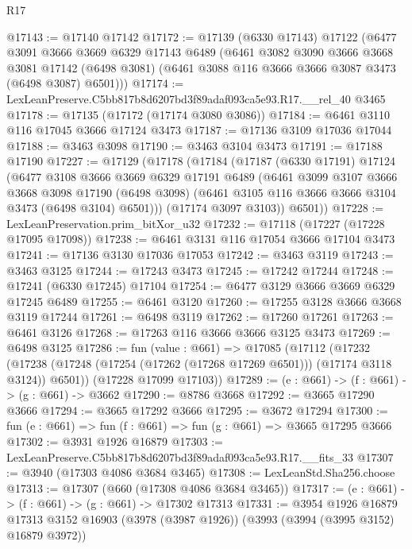 \begin{lexlean}{R17}
\begin{coremodule}
@17143 := @17140 @17142
@17172 := @17139
    (@6330 @17143)
    @17122
    (@6477
      @3091
      @3666
      @3669
      @6329
      @17143
      @6489
      (@6461
        @3082
        @3090
        @3666
        @3668
        @3081
        @17142
        (@6498 @3081)
        (@6461 @3088 @116 @3666 @3666 @3087 @3473 (@6498 @3087) @6501)))
@17174 := LexLeanPreserve.C5bb817b8d6207bd3f89adaf093ca5e93.R17.__rel_40 @3465
@17178 := @17135 (@17172 (@17174 @3080 @3086))
@17184 := @6461 @3110 @116 @17045 @3666 @17124 @3473
@17187 := @17136 @3109 @17036 @17044
@17188 := @3463 @3098
@17190 := @3463 @3104 @3473
@17191 := @17188 @17190
@17227 := @17129
    (@17178
      (@17184
        (@17187
          (@6330 @17191)
          @17124
          (@6477
            @3108
            @3666
            @3669
            @6329
            @17191
            @6489
            (@6461
              @3099
              @3107
              @3666
              @3668
              @3098
              @17190
              (@6498 @3098)
              (@6461 @3105 @116 @3666 @3666 @3104 @3473 (@6498 @3104) @6501)))
          (@17174 @3097 @3103))
        @6501))
@17228 := LexLeanPreservation.prim_bitXor_u32
@17232 := @17118 (@17227 (@17228 @17095 @17098))
@17238 := @6461 @3131 @116 @17054 @3666 @17104 @3473
@17241 := @17136 @3130 @17036 @17053
@17242 := @3463 @3119
@17243 := @3463 @3125
@17244 := @17243 @3473
@17245 := @17242 @17244
@17248 := @17241 (@6330 @17245) @17104
@17254 := @6477 @3129 @3666 @3669 @6329 @17245 @6489
@17255 := @6461 @3120
@17260 := @17255 @3128 @3666 @3668 @3119 @17244
@17261 := @6498 @3119
@17262 := @17260 @17261
@17263 := @6461 @3126
@17268 := @17263 @116 @3666 @3666 @3125 @3473
@17269 := @6498 @3125
@17286 := fun (value : @661) =>
  @17085
    (@17112
      (@17232 (@17238 (@17248 (@17254 (@17262 (@17268 @17269 @6501))) (@17174 @3118 @3124)) @6501))
      (@17228 @17099 @17103))
@17289 := (e : @661) -> (f : @661) -> (g : @661) -> @3662
@17290 := @8786 @3668
@17292 := @3665 @17290 @3666
@17294 := @3665 @17292 @3666
@17295 := @3672 @17294
@17300 := fun (e : @661) => fun (f : @661) => fun (g : @661) => @3665 @17295 @3666
@17302 := @3931 @1926 @16879
@17303 := LexLeanPreserve.C5bb817b8d6207bd3f89adaf093ca5e93.R17.__fits_33
@17307 := @3940 (@17303 @4086 @3684 @3465)
@17308 := LexLeanStd.Sha256.choose
@17313 := @17307 (@660 (@17308 @4086 @3684 @3465))
@17317 := (e : @661) -> (f : @661) -> (g : @661) -> @17302 @17313
@17331 := @3954
    @1926
    @16879
    @17313
    @3152
    @16903
    (@3978 (@3987 @1926))
    (@3993 (@3994 (@3995 @3152) @16879 @3972))

\end{coremodule}
\end{lexlean}

